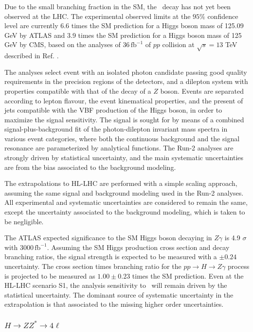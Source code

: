 Due to the small branching fraction in the SM, the \HZy\ decay has not yet been observed at the LHC. The experimental observed limits at the $95\%$ confidence level are currently 6.6 times the SM prediction for a Higgs boson mass of 125.09 GeV by ATLAS and 3.9 times the SM prediction for a Higgs boson mass of 125 GeV by CMS, based on the analyses of 36\,$\mathrm{fb}^{-1}$ of $pp$ collision at $\sqrt{s} = 13$ TeV described in Ref. \cite{HIGG-2016-14, Sirunyan:2018tbk}.

The analyses select event with an isolated photon candidate passing good quality requirements in the precision regions of the detectors, and a dilepton system with properties compatible with that of the decay of a $Z$ boson. Events are separated according to lepton flavour, the event kinematical properties, and the present of jets compatible with the VBF production of the Higgs boson, in order to maximize the signal sensitivity. The signal is sought for by means of a combined signal-plus-background fit of the photon-dilepton invariant mass spectra in various event categories, where both the continuous background and the signal resonance are parameterized by analytical functions. The Run-2 analyses are strongly driven by statistical uncertainty, and the main systematic uncertainties are from the bias associated to the background modeling.

The extrapolations to HL-LHC are performed with a simple scaling approach, assuming the same signal and background modeling used in the Run-2 analyses. All experimental and systematic uncertainties are considered to remain the same, except the uncertainty associated to the background modeling, which is taken to be negligible.

The ATLAS expected significance to the SM Higgs boson decaying in $Z\gamma$ is 4.9 $\sigma$ with 3000\,$\mathrm{fb}^{-1}$. Assuming the SM Higgs production cross section and decay branching ratios, the signal strength is expected to be measured with a $\pm0.24$ uncertainty. The cross section times branching ratio for the $pp\rightarrow H \rightarrow Z\gamma$ process is projected to be measured as $1.00\pm0.23$ times the SM prediction. Even at the HL-LHC scenario S1, the analysis sensitivity  to \HZy\ will remain driven by the statistical uncertainty. The dominant source of systematic uncertainty in the extrapolation is that associated to the 
missing higher order uncertainties.

\subsubsection{$H \to ZZ^* \to 4\ell$}

